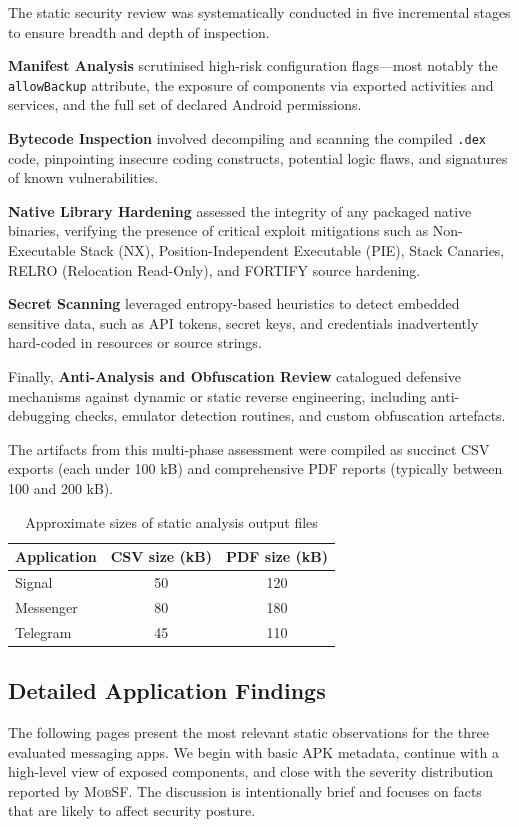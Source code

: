 \documentclass[a4paper,12pt]{report}
\begin{document}
The static security review was systematically conducted in five incremental stages to ensure breadth and depth of inspection.

\textbf{Manifest Analysis} scrutinised high-risk configuration flags—most notably the \lstinline{allowBackup} attribute, the exposure of components via exported activities and services, and the full set of declared Android permissions.

\textbf{Bytecode Inspection} involved decompiling and scanning the compiled \texttt{.dex} code, pinpointing insecure coding constructs, potential logic flaws, and signatures of known vulnerabilities.

\textbf{Native Library Hardening} assessed the integrity of any packaged native binaries, verifying the presence of critical exploit mitigations such as Non-Executable Stack (NX), Position-Independent Executable (PIE), Stack Canaries, RELRO (Relocation Read-Only), and \textsc{FORTIFY} source hardening.

\textbf{Secret Scanning} leveraged entropy-based heuristics to detect embedded sensitive data, such as API tokens, secret keys, and credentials inadvertently hard-coded in resources or source strings.

Finally, \textbf{Anti-Analysis and Obfuscation Review} catalogued defensive mechanisms against dynamic or static reverse engineering, including anti-debugging checks, emulator detection routines, and custom obfuscation artefacts.


The artifacts from this multi-phase assessment were compiled as succinct CSV exports (each under 100 kB) and comprehensive PDF reports (typically between 100 and 200 kB).

\begin{table}[H]
\centering
\begin{tabular}{|l|c|c|}
\hline
\textbf{Application} & \textbf{CSV size (kB)} & \textbf{PDF size (kB)} \\
\hline
Signal & 50 & 120 \\
Messenger & 80 & 180 \\
Telegram & 45 & 110 \\
\hline
\end{tabular}
\caption{Approximate sizes of static analysis output files}
\label{tab:static-sizes}
\end{table}

\subsection{Detailed Application Findings}
The following pages present the most relevant static observations for the three
evaluated messaging apps.  We begin with basic APK metadata, continue with a
high-level view of exposed components, and close with the severity distribution
reported by \textsc{MobSF}.  The discussion is intentionally brief and focuses on
facts that are likely to affect security posture.
\end{document}

